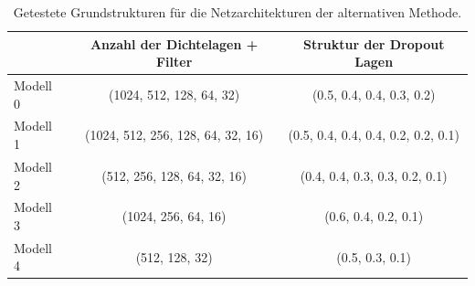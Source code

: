 %
%
\begin{table}
  \centering%
  \begin{tabular}{l
                  c
                  c}
      \toprule
      {}    & Anzahl der Dichtelagen + Filter     & Struktur der Dropout Lagen      \\
      \midrule
      Modell 0    & (1024, 512, 128, 64, 32)  & (0.5, 0.4, 0.4, 0.3, 0.2) \\
      Modell 1    & (1024, 512, 256, 128, 64, 32, 16)  & (0.5, 0.4, 0.4, 0.4, 0.2, 0.2, 0.1) \\
      Modell 2    & (512, 256, 128, 64, 32, 16)  & (0.4, 0.4, 0.3, 0.3, 0.2, 0.1) \\
      Modell 3    & (1024, 256, 64, 16)  & (0.6, 0.4, 0.2, 0.1) \\
      Modell 4    & (512, 128, 32)  & (0.5, 0.3, 0.1) \\
      \bottomrule
  \end{tabular}
  \caption{Getestete Grundstrukturen für die Netzarchitekturen der alternativen Methode.}
  \label{tab:grid}
\end{table}
%
%
